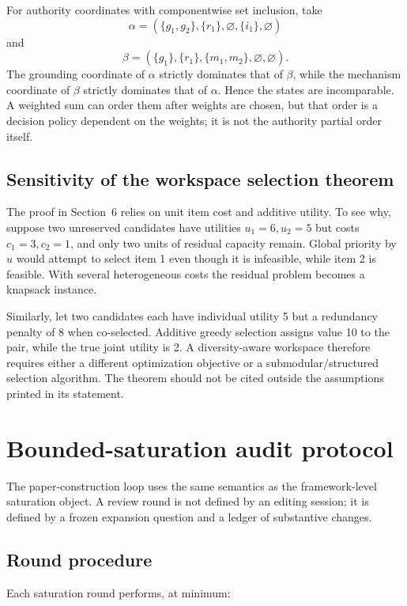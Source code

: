 \documentclass[11pt]{article}
\begin{document}
For authority coordinates with componentwise set inclusion, take
\[
\alpha=(\{g_1,g_2\},\{r_1\},\varnothing,\{i_1\},\varnothing)
\]
and
\[
\beta=(\{g_1\},\{r_1\},\{m_1,m_2\},\varnothing,\varnothing).
\]
The grounding coordinate of \(\alpha\) strictly dominates that of \(\beta\), while the mechanism coordinate of \(\beta\) strictly dominates that of \(\alpha\). Hence the states are incomparable. A weighted sum can order them after weights are chosen, but that order is a decision policy dependent on the weights; it is not the authority partial order itself.

\subsection{Sensitivity of the workspace selection theorem}

The proof in Section~6 relies on unit item cost and additive utility. To see why, suppose two unreserved candidates have utilities \(u_1=6,u_2=5\) but costs \(c_1=3,c_2=1\), and only two units of residual capacity remain. Global priority by \(u\) would attempt to select item 1 even though it is infeasible, while item 2 is feasible. With several heterogeneous costs the residual problem becomes a knapsack instance.

Similarly, let two candidates each have individual utility 5 but a redundancy penalty of 8 when co-selected. Additive greedy selection assigns value 10 to the pair, while the true joint utility is 2. A diversity-aware workspace therefore requires either a different optimization objective or a submodular/structured selection algorithm. The theorem should not be cited outside the assumptions printed in its statement.

\section{Bounded-saturation audit protocol}

The paper-construction loop uses the same semantics as the framework-level saturation object. A review round is not defined by an editing session; it is defined by a frozen expansion question and a ledger of substantive changes.

\subsection{Round procedure}

Each saturation round performs, at minimum:
\end{document}
